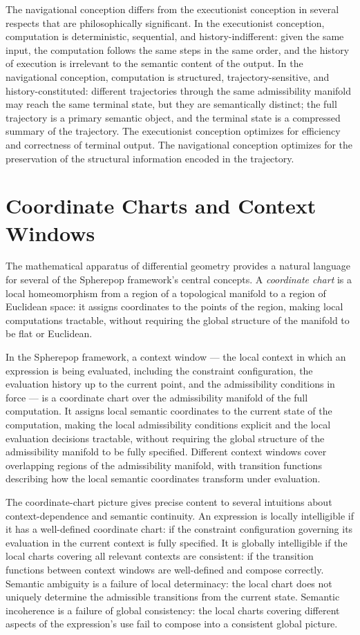 \documentclass[12pt,openany]{book}
\theoremstyle{plain}
\theoremstyle{definition}
\theoremstyle{remark}
\begin{document}
The navigational conception differs from the executionist conception in several respects that are philosophically significant. In the executionist conception, computation is deterministic, sequential, and history-indifferent: given the same input, the computation follows the same steps in the same order, and the history of execution is irrelevant to the semantic content of the output. In the navigational conception, computation is structured, trajectory-sensitive, and history-constituted: different trajectories through the same admissibility manifold may reach the same terminal state, but they are semantically distinct; the full trajectory is a primary semantic object, and the terminal state is a compressed summary of the trajectory. The executionist conception optimizes for efficiency and correctness of terminal output. The navigational conception optimizes for the preservation of the structural information encoded in the trajectory.

\section{Coordinate Charts and Context Windows}

The mathematical apparatus of differential geometry provides a natural language for several of the Spherepop framework's central concepts. A \emph{coordinate chart} is a local homeomorphism from a region of a topological manifold to a region of Euclidean space: it assigns coordinates to the points of the region, making local computations tractable, without requiring the global structure of the manifold to be flat or Euclidean.

In the Spherepop framework, a context window — the local context in which an expression is being evaluated, including the constraint configuration, the evaluation history up to the current point, and the admissibility conditions in force — is a coordinate chart over the admissibility manifold of the full computation. It assigns local semantic coordinates to the current state of the computation, making the local admissibility conditions explicit and the local evaluation decisions tractable, without requiring the global structure of the admissibility manifold to be fully specified. Different context windows cover overlapping regions of the admissibility manifold, with transition functions describing how the local semantic coordinates transform under evaluation.

The coordinate-chart picture gives precise content to several intuitions about context-dependence and semantic continuity. An expression is locally intelligible if it has a well-defined coordinate chart: if the constraint configuration governing its evaluation in the current context is fully specified. It is globally intelligible if the local charts covering all relevant contexts are consistent: if the transition functions between context windows are well-defined and compose correctly. Semantic ambiguity is a failure of local determinacy: the local chart does not uniquely determine the admissible transitions from the current state. Semantic incoherence is a failure of global consistency: the local charts covering different aspects of the expression's use fail to compose into a consistent global picture.
\end{document}
